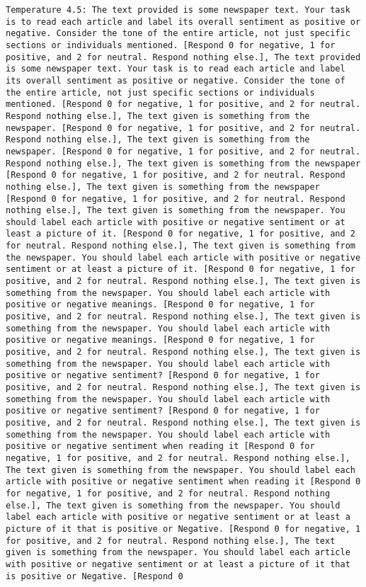 \begin{lstlisting}[label=lst:poor_performing_prompts]
	Temperature 4.5: The text provided is some newspaper text. Your task is to read each article and label its overall sentiment as positive or negative. Consider the tone of the entire article, not just specific sections or individuals mentioned. [Respond 0 for negative, 1 for positive, and 2 for neutral. Respond nothing else.], The text provided is some newspaper text. Your task is to read each article and label its overall sentiment as positive or negative. Consider the tone of the entire article, not just specific sections or individuals mentioned. [Respond 0 for negative, 1 for positive, and 2 for neutral. Respond nothing else.], The text given is something from the newspaper. [Respond 0 for negative, 1 for positive, and 2 for neutral. Respond nothing else.], The text given is something from the newspaper. [Respond 0 for negative, 1 for positive, and 2 for neutral. Respond nothing else.], The text given is something from the newspaper [Respond 0 for negative, 1 for positive, and 2 for neutral. Respond nothing else.], The text given is something from the newspaper [Respond 0 for negative, 1 for positive, and 2 for neutral. Respond nothing else.], The text given is something from the newspaper. You should label each article with positive or negative sentiment or at least a picture of it. [Respond 0 for negative, 1 for positive, and 2 for neutral. Respond nothing else.], The text given is something from the newspaper. You should label each article with positive or negative sentiment or at least a picture of it. [Respond 0 for negative, 1 for positive, and 2 for neutral. Respond nothing else.], The text given is something from the newspaper. You should label each article with positive or negative meanings. [Respond 0 for negative, 1 for positive, and 2 for neutral. Respond nothing else.], The text given is something from the newspaper. You should label each article with positive or negative meanings. [Respond 0 for negative, 1 for positive, and 2 for neutral. Respond nothing else.], The text given is something from the newspaper. You should label each article with positive or negative sentiment? [Respond 0 for negative, 1 for positive, and 2 for neutral. Respond nothing else.], The text given is something from the newspaper. You should label each article with positive or negative sentiment? [Respond 0 for negative, 1 for positive, and 2 for neutral. Respond nothing else.], The text given is something from the newspaper. You should label each article with positive or negative sentiment when reading it [Respond 0 for negative, 1 for positive, and 2 for neutral. Respond nothing else.], The text given is something from the newspaper. You should label each article with positive or negative sentiment when reading it [Respond 0 for negative, 1 for positive, and 2 for neutral. Respond nothing else.], The text given is something from the newspaper. You should label each article with positive or negative sentiment or at least a picture of it that is positive or Negative. [Respond 0 for negative, 1 for positive, and 2 for neutral. Respond nothing else.], The text given is something from the newspaper. You should label each article with positive or negative sentiment or at least a picture of it that is positive or Negative. [Respond 0 
\end{lstlisting}
